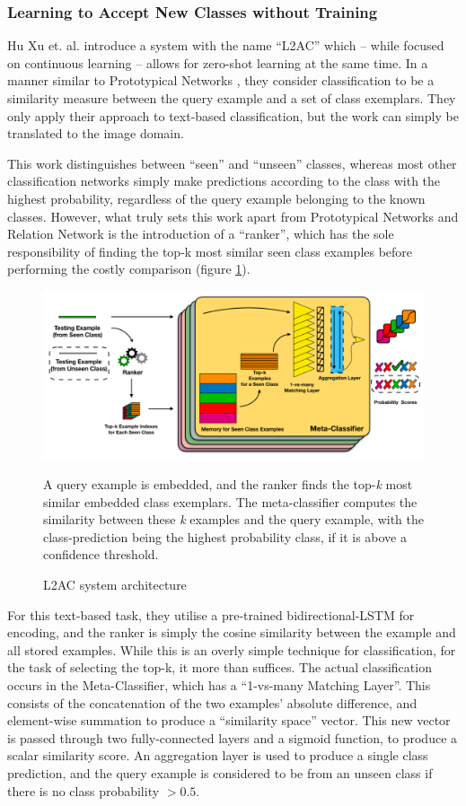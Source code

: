 \documentclass{report}
\begin{document}
\subsubsection{Learning to Accept New Classes without Training}
Hu Xu et. al. \parencite{l2ac} introduce a system with the name ``L2AC'' which -- while focused on continuous learning -- allows for zero-shot learning at the same time. In a manner similar to Prototypical Networks \parencite{prototypical}, they consider classification to be a similarity measure between the query example and a set of class exemplars. They only apply their approach to text-based classification, but the work can simply be translated to the image domain. \par
This work distinguishes between ``seen'' and ``unseen'' classes, whereas most other classification networks simply make predictions according to the class with the highest probability, regardless of the query example belonging to the known classes. However, what truly sets this work apart from Prototypical Networks and Relation Network \parencite{relationnet} is the introduction of a ``ranker'', which has the sole responsibility of finding the top-k most similar seen class examples before performing the costly comparison (figure \ref{fig:l2ac:1}). \par
\begin{figure}[h]
	\centering
	\includegraphics[width=14cm]{l2ac}
	\caption{L2AC system architecture}
	A query example is embedded, and the ranker finds the top-\textit{k} most similar embedded class exemplars. The meta-classifier computes the similarity between these \textit{k} examples and the query example, with the class-prediction being the highest probability class, if it is above a confidence threshold.
	\label{fig:l2ac:1}
\end{figure}
For this text-based task, they utilise a pre-trained bidirectional-LSTM for encoding, and the ranker is simply the cosine similarity between the example and all stored examples. While this is an overly simple technique for classification, for the task of selecting the top-k, it more than suffices. The actual classification occurs in the Meta-Classifier, which has a ``1-vs-many Matching Layer''. This consists of the concatenation of the two examples' absolute difference, and element-wise summation to produce a ``similarity space'' vector. This new vector is passed through two fully-connected layers and a sigmoid function, to produce a scalar similarity score. An aggregation layer is used to produce a single class prediction, and the query example is considered to be from an unseen class if there is no class probability $> 0.5$. \par
\end{document}
